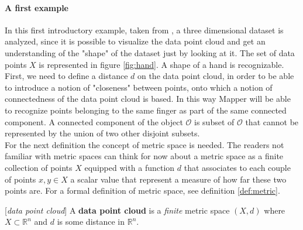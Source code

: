 \paragraph{A first example} 
In this first introductory example, taken from \cite{extracting_insights}, a three dimensional dataset is analyzed, since it is possible to visualize the data point cloud and get an understanding of the "shape" of the dataset just by looking at it.\newline 
The set of data points $X$ is represented in figure \ref{fig:hand}. A shape of a hand is recognizable. First, we need to define a distance $d$ on the data point cloud, in order to be able to introduce a notion of "closeness" between points, onto which a notion of connectedness of the data point cloud is based. In this way Mapper will be able to recognize points belonging to the same finger as part of the same connected component. A connected component of the object $\mathcal O$ is subset of $\mathcal O$ that cannot be represented by the union of two other disjoint subsets. \\
For the next definition the concept of metric space is needed. The readers not familiar with metric spaces can think for now about a metric space as a finite collection of points $X$ equipped with a function $d$ that associates to each couple of points $x,y\in X$ a scalar value that represent a measure of how far these two points are. For a formal definition of metric space, see definition \ref{def:metric}. 
\begin{definition}{[\textit{data point cloud}]}
	A \textbf{data point cloud} is a \textit{finite} metric space $(X,d)$ where $X \subset \mathbb{R}^n$ and $d$ is some distance in $\mathbb{R}^n$. 
\end{definition}


